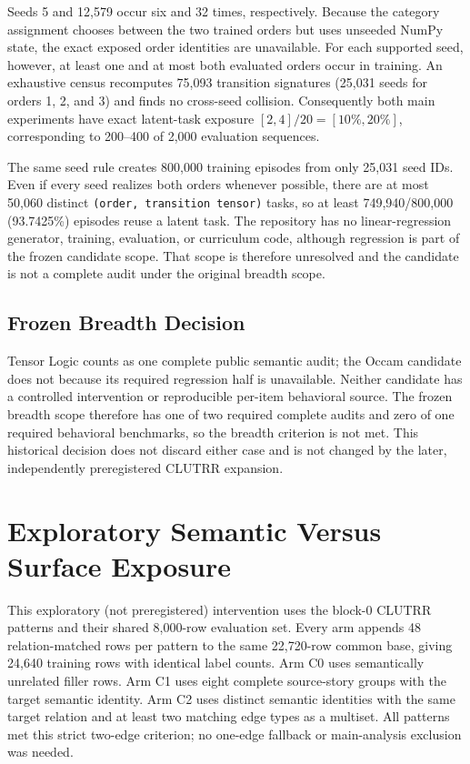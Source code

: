 Seeds 5 and 12,579 occur six and 32 times, respectively.  Because the
category assignment chooses between the two trained orders but uses unseeded
NumPy state, the exact exposed order identities are unavailable.  For each
supported seed, however, at least one and at most both evaluated orders occur
in training.  An exhaustive census recomputes 75,093 transition signatures
(25,031 seeds for orders 1, 2, and 3) and finds no cross-seed collision.
Consequently both main experiments have exact latent-task exposure
\([2,4]/20=[10\%,20\%]\), corresponding to 200--400 of 2,000 evaluation
sequences.

The same seed rule creates 800,000 training episodes from only 25,031 seed
IDs.  Even if every seed realizes both orders whenever possible, there are at
most 50,060 distinct \texttt{(order, transition tensor)} tasks, so at least
749,940/800,000 (93.7425\%) episodes reuse a latent task.  The repository has
no linear-regression generator, training, evaluation, or curriculum code,
although regression is part of the frozen candidate scope.  That scope is
therefore unresolved and the candidate is not a complete audit under the
original breadth scope.

\subsection{Frozen Breadth Decision}

Tensor Logic counts as one complete public semantic audit; the Occam
candidate does not because its required regression half is unavailable.
Neither candidate has a controlled intervention or reproducible per-item
behavioral source.  The frozen breadth scope therefore has one of two required
complete audits and zero of one required behavioral benchmarks, so the
breadth criterion is not met.  This historical decision does not discard
either case and is not
changed by the later, independently preregistered CLUTRR expansion.



\section{Exploratory Semantic Versus Surface Exposure}
\label{tmlrs:app:semantic-surface}

This exploratory (not preregistered) intervention uses the \TSixPatterns{}
block-0 CLUTRR patterns and their shared 8,000-row evaluation set.  Every
arm appends 48 relation-matched rows per pattern to the same 22,720-row
common base, giving 24,640 training rows with identical label counts.
Arm C0 uses semantically unrelated filler rows.  Arm C1 uses eight complete
source-story groups with the target semantic identity.  Arm C2 uses distinct
semantic identities with the same target relation and at least two matching
edge types as a multiset.  All patterns met this strict two-edge criterion;
no one-edge fallback or main-analysis exclusion was needed.

